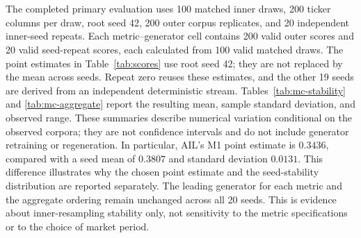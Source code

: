 \appendix
\section{}\label{app:reproducibility}
{
The completed primary evaluation uses 100 matched inner draws,
200 ticker columns per draw, root seed 42, 200 outer corpus
replicates, and 20 independent inner-seed repeats.
Each metric--generator cell contains 200 valid outer scores and
20 valid seed-repeat scores, each calculated from 100 valid matched draws.
The point estimates in Table~\ref{tab:scores} use root seed 42;
they are not replaced by the mean across seeds.
Repeat zero reuses these estimates, and the other 19 seeds are derived
from an independent deterministic stream.
Tables~\ref{tab:mc-stability} and \ref{tab:mc-aggregate} report
the resulting mean, sample standard deviation, and observed range.
These summaries describe numerical variation conditional on the
observed corpora; they are not confidence intervals and do not include
generator retraining or regeneration.
In particular, AIL's M1 point estimate is $0.3436$, compared with
a seed mean of $0.3807$ and standard deviation $0.0131$.
This difference illustrates why the chosen point estimate and the
seed-stability distribution are reported separately.
The leading generator for each metric and the aggregate ordering
remain unchanged across all 20 seeds.
This is evidence about inner-resampling stability only, not
sensitivity to the metric specifications or to the choice of market period.
}

